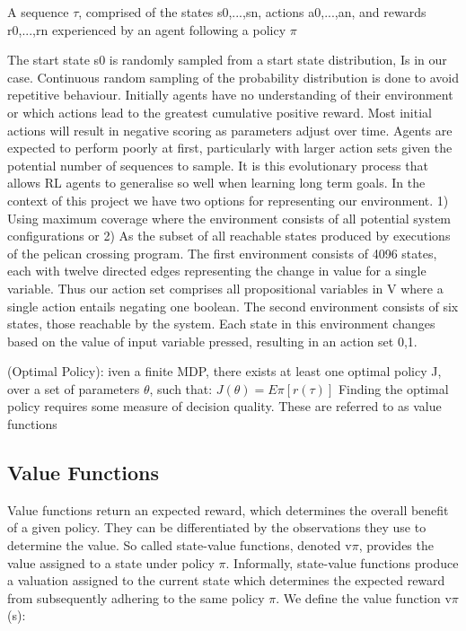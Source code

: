 \documentclass[runningheads]{llncs}
\begin{document}
\begin{definition}[Trajectory]
	A sequence $\tau$, comprised of the states s0,...,sn, actions
	a0,...,an, and rewards r0,...,rn experienced by an agent following a policy $\pi$
\end{definition}
The start state s0 is randomly sampled from a start state distribution, Is in our
case. Continuous random sampling of the probability distribution is done to avoid
repetitive behaviour. Initially agents have no understanding of their environment or
which actions lead to the greatest cumulative positive reward. Most initial actions will
result in negative scoring as parameters adjust over time. Agents are expected to perform
poorly at first, particularly with larger action sets given the potential number of sequences
to sample. It is this evolutionary process that allows RL agents to generalise so well
when learning long term goals.
In the context of this project we have two options for representing our environment.
1) Using maximum coverage where the environment consists of all potential system
configurations or 2) As the subset of all reachable states produced by executions of the
pelican crossing program. The first environment consists of 4096 states, each with twelve
directed edges representing the change in value for a single variable. Thus our action
set comprises all propositional variables in V where a single action entails negating
one boolean. The second environment consists of six states, those reachable by the
system. Each state in this environment changes based on the value of input variable
pressed, resulting in an action set {0,1}.

\begin{theorem}
	(Optimal Policy): iven a finite MDP, there exists at least one optimal
	policy J, over a set of parameters $\theta$, such that:
	$J(\theta) = E\pi[r(\tau)]$
	Finding the optimal policy requires some measure of decision quality. These are
	referred to as value functions
\end{theorem}

\subsection{Value Functions}
Value functions return an expected reward, which determines the overall benefit of a given
policy. They can be differentiated by the observations they use to determine the value. So called state-value functions, denoted v$\pi$, provides the value assigned to a state under
policy $\pi$. Informally, state-value functions produce a valuation assigned to the current
state which determines the expected reward from subsequently adhering to the same
policy $\pi$. We define the value function v$\pi$(s):
\end{document}
